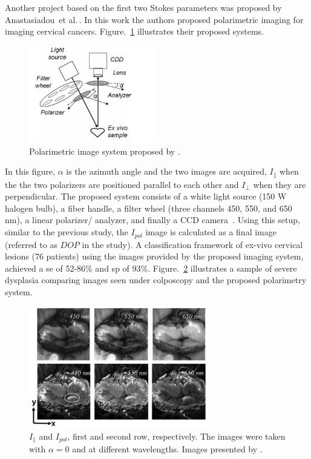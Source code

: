 Another project based on the first two Stokes parameters was proposed by Anastasiadou~et al.\,\cite{Anastasiadou2008}.
In this work the authors proposed polarimetric imaging for imaging cervical cancers.
Figure.~\ref{fig:SPcervicalcancer} illustrates their proposed systems.
\begin{figure}[h]
\centering
\includegraphics[width = 0.5\textwidth]{Chapter4/Figures/ImagePolarimetryCervicalCancer.png}
\caption[Polarimetry system proposed by \cite{Anastasiadou2008}]{Polarimetric image system proposed by \cite{Anastasiadou2008}.}
\label{fig:SPcervicalcancer}
\end{figure}
\noindent In this figure, $\alpha$ is the azimuth angle and the two images are acquired, $I_{\parallel}$ when the the two polarizers are positioned parallel to each other and $I_{\perp}$ when they are perpendicular.
The proposed system consists of a white light source (150 W halogen bulb), a fiber handle, a filter wheel (three channels 450, 550, and 650 \si{\nano\meter}), a linear polarizer/ analyzer, and finally a CCD camera~\cite{Anastasiadou2008}.
Using this setup, similar to the previous study, the $I_{pol}$ image is calculated as a final image (referred to as $DOP$ in the study).
A classification framework of ex-vivo cervical lesions (76 patients) using the images provided by the proposed imaging system, achieved a \ac{se} of 52-86\% and \ac{sp} of 93\%.
Figure.~\ref{fig:CC-Ex1} illustrates a sample of severe dysplasia comparing images seen under colposcopy and the proposed polarimetry system.
\begin{figure}[h]
\begin{center}
\includegraphics[width = 0.7\textwidth]{Chapter4/Figures/CC-Ex1.png}
\caption[Polarimetry images of ex-vivo cervical dysplasia~\cite{Anastasiadou2008}]{$I_{\parallel}$ and $I_{pol}$, first and second row, respectively. The images were taken with $\alpha = 0$ and at different wavelengths. Images presented by \cite{Anastasiadou2008}.}
\label{fig:CC-Ex1}
\end{center}
\end{figure}
